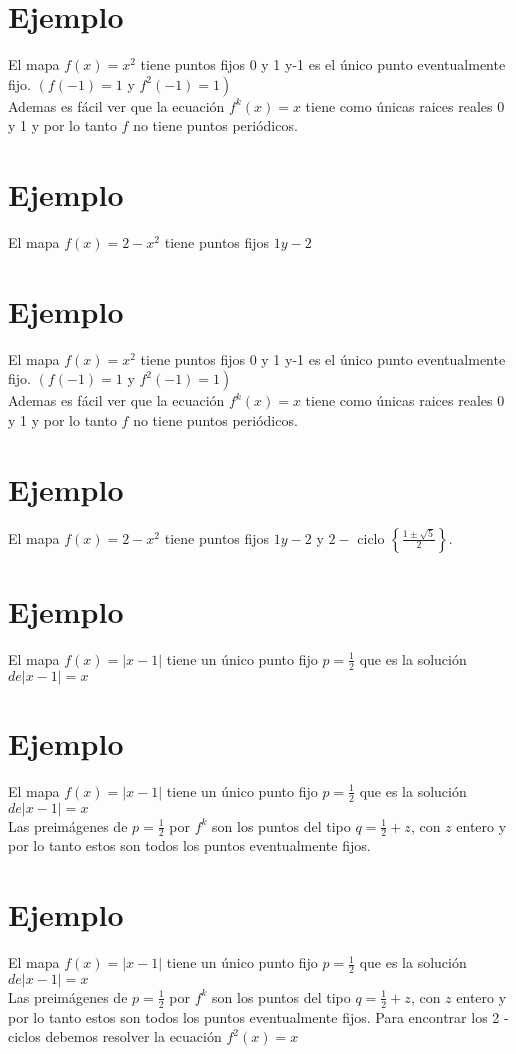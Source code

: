 \documentclass[11pt]{beamer}
\begin{document}
\section*{Ejemplo}
El mapa $f(x)=x^{2}$ tiene puntos fijos 0 y 1 y-1 es el único punto eventualmente fijo. $\left(f(-1)=1\right.$ y $\left.f^{2}(-1)=1\right)$\\
Ademas es fácil ver que la ecuación $f^{k}(x)=x$ tiene como únicas raices reales 0 y 1 y por lo tanto $f$ no tiene puntos periódicos.

\section*{Ejemplo}
El mapa $f(x)=2-x^{2}$ tiene puntos fijos $1 y-2$

\section*{Ejemplo}
El mapa $f(x)=x^{2}$ tiene puntos fijos 0 y 1 y-1 es el único punto eventualmente fijo. $\left(f(-1)=1\right.$ y $\left.f^{2}(-1)=1\right)$\\
Ademas es fácil ver que la ecuación $f^{k}(x)=x$ tiene como únicas raices reales 0 y 1 y por lo tanto $f$ no tiene puntos periódicos.

\section*{Ejemplo}
El mapa $f(x)=2-x^{2}$ tiene puntos fijos $1 y-2$ y $2-$ ciclo $\left\{\frac{1 \pm \sqrt{5}}{2}\right\}$.

\section*{Ejemplo}
El mapa $f(x)=|x-1|$ tiene un único punto fijo $p=\frac{1}{2}$ que es la solución $d e|x-1|=x$

\section*{Ejemplo}
El mapa $f(x)=|x-1|$ tiene un único punto fijo $p=\frac{1}{2}$ que es la solución $d e|x-1|=x$\\
Las preimágenes de $p=\frac{1}{2}$ por $f^{k}$ son los puntos del tipo $q=\frac{1}{2}+z$, con $z$ entero y por lo tanto estos son todos los puntos eventualmente fijos.

\section*{Ejemplo}
El mapa $f(x)=|x-1|$ tiene un único punto fijo $p=\frac{1}{2}$ que es la solución $d e|x-1|=x$\\
Las preimágenes de $p=\frac{1}{2}$ por $f^{k}$ son los puntos del tipo $q=\frac{1}{2}+z$, con $z$ entero y por lo tanto estos son todos los puntos eventualmente fijos. Para encontrar los 2 - ciclos debemos resolver la ecuación $f^{2}(x)=x$
\end{document}
